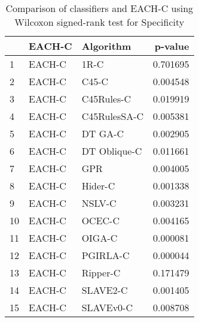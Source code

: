 \begin{table}
\footnotesize
\caption{Comparison of classifiers and EACH-C using Wilcoxon signed-rank test for Specificity}
\label{tab:EACH-C wilcoxon Specificity comparison}
\begin{tabular}{lllr}
\hline
 & EACH-C & Algorithm & p-value \\
\hline
1 & EACH-C & 1R-C & 0.701695 \\
2 & EACH-C & C45-C & 0.004548 \\
3 & EACH-C & C45Rules-C & 0.019919 \\
4 & EACH-C & C45RulesSA-C & 0.005381 \\
5 & EACH-C & DT GA-C & 0.002905 \\
6 & EACH-C & DT Oblique-C & 0.011661 \\
7 & EACH-C & GPR & 0.004005 \\
8 & EACH-C & Hider-C & 0.001338 \\
9 & EACH-C & NSLV-C & 0.003231 \\
10 & EACH-C & OCEC-C & 0.004165 \\
11 & EACH-C & OIGA-C & 0.000081 \\
12 & EACH-C & PGIRLA-C & 0.000044 \\
13 & EACH-C & Ripper-C & 0.171479 \\
14 & EACH-C & SLAVE2-C & 0.001405 \\
15 & EACH-C & SLAVEv0-C & 0.008708 \\
\hline
\end{tabular}
\end{table}
